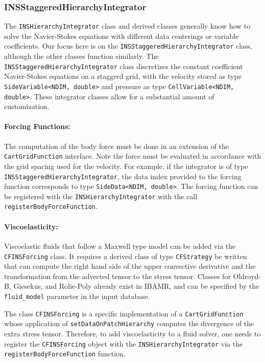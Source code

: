 \documentclass{article}
\begin{document}
\subsubsection{INSStaggeredHierarchyIntegrator}
The \verb|INSHierarchyIntegrator| class and derived classes generally know how to solve the Navier-Stokes equations with different data centerings or variable coefficients. Our focus here is on the \verb|INSStaggeredHierarchyIntegrator| class, although the other classes function similarly. The \verb|INSStaggeredHierarchyIntegrator| class discretizes the constant coefficient Navier-Stokes equations on a staggerd grid, with the velocity stored as type \verb|SideVariable<NDIM, double>| and pressure as type \verb|CellVariable<NDIM, double>|. These integrator classes allow for a substantial amount of customization.

\paragraph{Forcing Functions:}
The computation of the body force must be done in an extension of the \verb|CartGridFunction| interface. Note the force must be evaluated in accordance with the grid spacing used for the velocity. For example, if the integrator is of type \verb|INSStaggeredHierarchyIntegrator|, the data index provided to the forcing function corresponds to type \verb|SideData<NDIM, double>|. The forcing function can be registered with the \verb|INSHierarchyIntegrator| with the call \verb|registerBodyForceFunction|. 

\paragraph{Viscoelasticity:}
Viscoelastic fluids that follow a Maxwell type model can be added via the \verb|CFINSForcing| class. It requires a derived class of type \verb|CFStrategy| be written that can compute the right hand side of the upper convective derivative and the transformation from the advected tensor to the stress tensor. Classes for Oldroyd-B, Giesekus, and Rolie-Poly already exist in IBAMR, and can be specified by the \verb|fluid_model| parameter in the input database.

The class \verb|CFINSForcing| is a specific implementation of a \verb|CartGridFunction| whose application of \verb|setDataOnPatchHierarchy| computes the divergence of the extra stress tensor. Therefore, to add viscoelasticity to a fluid solver, one needs to register the \verb|CFINSForcing| object with the \verb|INSHierarchyIntegrator| via the \verb|registerBodyForceFunction| function.
\end{document}

